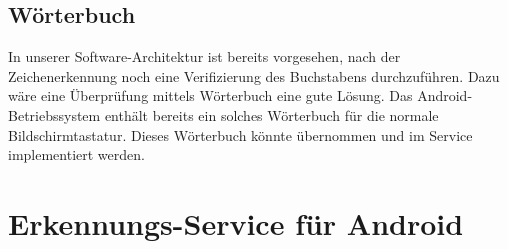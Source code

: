 \subsection{Wörterbuch}
In unserer Software-Architektur ist bereits vorgesehen, nach der Zeichenerkennung noch eine Verifizierung des Buchstabens durchzuführen. Dazu wäre eine Überprüfung mittels Wörterbuch eine gute Lösung. Das Android-Betriebssystem enthält bereits ein solches Wörterbuch für die normale Bildschirmtastatur. Dieses Wörterbuch könnte übernommen und im Service implementiert werden.

\section{Erkennungs-Service für Android}